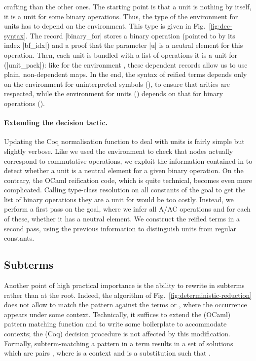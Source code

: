 \documentclass{llncs}
\begin{document}
crafting than the other ones. The starting point is that a unit is
nothing by itself, it is a unit for some binary operations.
Thus, the type of the environment for units has to depend on the
 environment.
This type is given in Fig.~\ref{fig:dec-syntax}. The record
\coqinline|binary_for| stores a binary operation (pointed to by its
index \coqinline|bf_idx|) and a proof that the parameter \coqinline|u|
is a neutral element for this operation. Then, each unit is bundled
with a list of operations it is a unit for (\coqinline|unit_pack|):
like for the environment , these dependent records allow
us to use plain, non-dependent maps.
In the end, the syntax of reified terms depends only on the
environment for uninterpreted symbols (), to ensure that
arities are respected, while the environment for units ()
depends on that for binary operations ().

\paragraph{Extending the decision tactic.}

Updating the Coq normalisation function to deal with units is fairly
simple but slightly verbose. Like we used the  environment
to check that  nodes actually correspond to commutative
operations, we exploit the information contained in  to
detect whether a unit is a neutral element for a given binary
operation.
On the contrary, the OCaml reification code, which is quite technical,
becomes even more complicated. Calling type-class resolution on all
constants of the goal to get the list of binary operations they are a
unit for would be too costly. Instead, we perform a first pass on the
goal, where we infer all A/AC operations and for each of these,
whether it has a neutral element. We construct the reified terms in a
second pass, using the previous information to distinguish units from
regular constants.

\subsection{Subterms}
\label{ssec:subterm} 

Another point of high practical importance is the ability to rewrite
in subterms rather than at the root.  Indeed, the algorithm of
Fig.~\ref{fig:deterministic-reduction} does not allow to match the
pattern  against the terms  or , where the
occurrence appears under some context. Technically, it suffices to
extend the (OCaml) pattern matching function and to write some
boilerplate to accommodate contexts; the (Coq) decision procedure is
not affected by this modification. Formally, subterm-matching a
pattern  in a term  results in a set of solutions which are
pairs , where  is a context and 
is a substitution such that .
\end{document}
